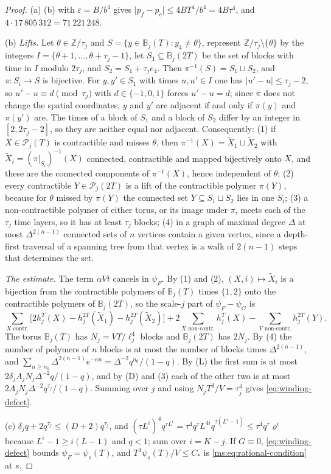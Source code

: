 \documentclass[11pt,a4paper]{amsart}
\theoremstyle{definition}
\theoremstyle{remark}
\numberwithin{equation}{section}
\newcommand{\Z}{\mathbb{Z}}          %
\newcommand{\abs}[1]{\lvert #1\rvert}      %
\newcommand{\psiT}[2]{\psi_{#1}(#2)}       %
\begin{document}
\begin{proof}
(a) (b) with $\varepsilon=B/b^4$ gives $\abs{p_f-p_c}\le4BT^4/b^4=4B\tau^4$, and $4\cdot17\,805\,312=71\,221\,248$.

(b) \emph{Lifts.} Let $\theta\in\Z/\tau_j$ and $S=\{y\in\mathbb B_j(T):y_4\ne\theta\}$, represent $\Z/\tau_j\setminus\{\theta\}$ by the integers $I=\{\theta+1,\dots,\theta+\tau_j-1\}$, let $S_1\subseteq\mathbb B_j(2T)$ be the set of blocks with time in $I$ modulo $2\tau_j$, and $S_2=S_1+\tau_je_4$. Then $\pi^{-1}(S)=S_1\sqcup S_2$, and $\pi\colon S_i\to S$ is bijective. For $y,y'\in S_1$ with times $u,u'\in I$ one has $\abs{u'-u}\le\tau_j-2$, so $u'-u\equiv d\pmod{\tau_j}$ with $d\in\{-1,0,1\}$ forces $u'-u=d$; since $\pi$ does not change the spatial coordinates, $y$ and $y'$ are adjacent if and only if $\pi(y)$ and $\pi(y')$ are. The times of a block of $S_1$ and a block of $S_2$ differ by an integer in $[2,2\tau_j-2]$, so they are neither equal nor adjacent. Consequently: (1) if $X\in\mathcal P_j(T)$ is contractible and misses $\theta$, then $\pi^{-1}(X)=\tilde X_1\sqcup\tilde X_2$ with $\tilde X_i=(\pi|_{S_i})^{-1}(X)$ connected, contractible and mapped bijectively onto $X$, and these are the connected components of $\pi^{-1}(X)$, hence independent of $\theta$; (2) every contractible $Y\in\mathcal P_j(2T)$ is a lift of the contractible polymer $\pi(Y)$, because for $\theta$ missed by $\pi(Y)$ the connected set $Y\subseteq S_1\sqcup S_2$ lies in one $S_i$; (3) a non-contractible polymer of either torus, or its image under $\pi$, meets each of the $\tau_j$ time layers, so it has at least $\tau_j$ blocks; (4) in a graph of maximal degree $\Delta$ at most $\Delta^{2(n-1)}$ connected sets of $n$ vertices contain a given vertex, since a depth-first traversal of a spanning tree from that vertex is a walk of $2(n-1)$ steps that determines the set.

\emph{The estimate.} The term $\alpha Vt$ cancels in $\psi_F$. By (1) and (2), $(X,i)\mapsto\tilde X_i$ is a bijection from the contractible polymers of $\mathbb B_j(T)$ times $\{1,2\}$ onto the contractible polymers of $\mathbb B_j(2T)$, so the scale-$j$ part of $\psi_F-\psi_G$ is
\[
\sum_{X\text{ contr.}}\bigl[2h^T_j(X)-h^{2T}_j(\tilde X_1)-h^{2T}_j(\tilde X_2)\bigr]+2\sum_{X\text{ non-contr.}}h^T_j(X)-\sum_{Y\text{ non-contr.}}h^{2T}_j(Y).
\]
The torus $\mathbb B_j(T)$ has $N_j=VT/\ell_j^4$ blocks and $\mathbb B_j(2T)$ has $2N_j$. By (4) the number of polymers of $n$ blocks is at most the number of blocks times $\Delta^{2(n-1)}$, and $\sum_{n\ge n_0}\Delta^{2(n-1)}e^{-\kappa n}=\Delta^{-2}q^{n_0}/(1-q)$. By (L) the first sum is at most $2\delta_jA_jN_j\Delta^{-2}q/(1-q)$, and by (D) and (3) each of the other two is at most $2A_jN_j\Delta^{-2}q^{\tau_j}/(1-q)$. Summing over $j$ and using $N_jT^3/V=\tau_j^4$ gives \eqref{eq:winding-defect}.

(c) $\delta_jq+2q^{\tau_j}\le(D+2)q^{\tau_j}$, and $(\tau L^i)^4q^{\tau L^i}=\tau^4q^\tau L^{4i}q^{\tau(L^i-1)}\le\tau^4q^\tau\varrho^i$ because $L^i-1\ge i(L-1)$ and $q<1$; sum over $i=K-j$. If $G\equiv0$, \eqref{eq:winding-defect} bounds $\psi_F=\psiT sT$, and $T^3\psiT sT/V\le C_*$ is \eqref{ms:eq:rational-condition} at $s$.
\end{proof}
\end{document}
